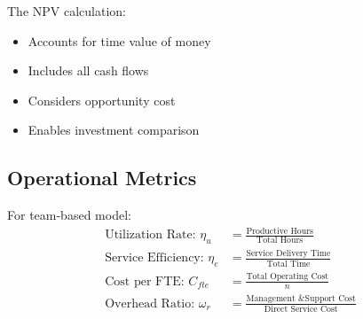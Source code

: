 \documentclass[12pt,a4paper]{article}
\newenvironment{definition}[1]
{\begin{mdframed}[style=definitionstyle,frametitle={Definition: #1}]}
{\end{mdframed}}
\newenvironment{explanation}
{\begin{mdframed}[style=explanationstyle,frametitle={Explanation}]}
{\end{mdframed}}
\begin{document}
\begin{explanation}
The NPV calculation:
\begin{itemize}
    \item Accounts for time value of money
    \item Includes all cash flows
    \item Considers opportunity cost
    \item Enables investment comparison
\end{itemize}
\end{explanation}

\subsection{Operational Metrics}
\begin{definition}{Team Efficiency Metrics}
For team-based model:
\begin{align*}
    \text{Utilization Rate: } \eta_u &= \frac{\text{Productive Hours}}{\text{Total Hours}} \\[1em]
    \text{Service Efficiency: } \eta_e &= \frac{\text{Service Delivery Time}}{\text{Total Time}} \\[1em]
    \text{Cost per FTE: } C_{fte} &= \frac{\text{Total Operating Cost}}{n} \\[1em]
    \text{Overhead Ratio: } \omega_r &= \frac{\text{Management \& Support Cost}}{\text{Direct Service Cost}}
\end{align*}
\end{definition}
\end{document}
